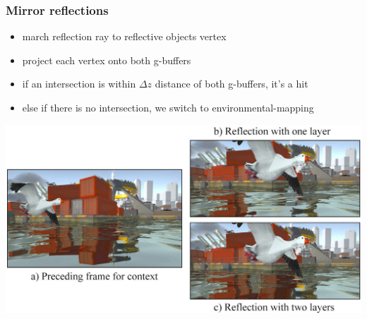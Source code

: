\documentclass[aspectratio=169]{beamer}
\begin{document}
	\begin{frame}
		\frametitle{Mirror reflections}
		\begin{itemize}
			\item march reflection ray to reflective objects vertex
			\item project each vertex onto both g-buffers
			\item if an intersection is within $\Delta z$ distance of both g-buffers, it's a hit
			\item else if there is no intersection, we switch to environmental-mapping
		\end{itemize}
		\begin{center}
			\includegraphics[width=.7\textwidth]{img/reflections.png}
		\end{center}
	\end{frame}	
\end{document}
